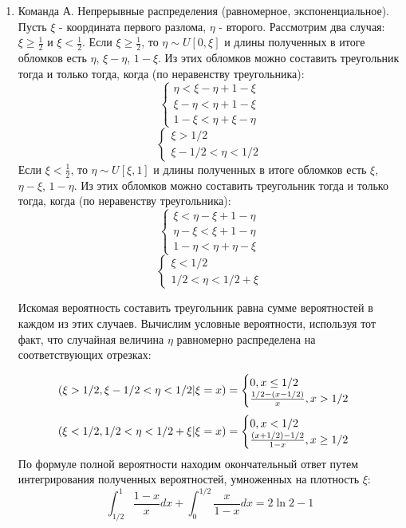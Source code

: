 \documentclass[a4paper,12pt]{article}
\let\P\relax
\DeclareMathOperator{\P}{\mathbb{P}}
\begin{document}
\begin{enumerate}
\item Команда А. Непрерывные распределения (равномерное, экспоненциальное).
Пусть $\xi$ - координата первого разлома, $\eta$ - второго. Рассмотрим два случая: $\xi\geq\frac{1}{2}$ и $\xi<\frac{1}{2}$.
Если $\xi\geq\frac{1}{2}$, то $\eta \sim U[0,\xi]$ и длины полученных в итоге обломков есть $\eta$, $\xi-\eta$, $1-\xi$. Из этих обломков можно составить треугольник тогда и только тогда, когда (по неравенству треугольника):
\[\begin{cases} \eta < \xi-\eta+1-\xi\\
\xi-\eta<\eta+1-\xi\\
1-\xi<\eta+\xi-\eta
\end{cases}
\]
\[\begin{cases} \xi>1/2\\
\xi-1/2<\eta<1/2
\end{cases}
\]
Если $\xi<\frac{1}{2}$, то $\eta \sim U[\xi,1]$ и длины полученных в итоге обломков есть $\xi$, $\eta-\xi$, $1-\eta$. Из этих обломков можно составить треугольник тогда и только тогда, когда (по неравенству треугольника):
\[\begin{cases} \xi < \eta-\xi+1-\eta\\
\eta-\xi<\xi+1-\eta\\
1-\eta<\eta+\eta-\xi
\end{cases}
\]
\[\begin{cases} \xi<1/2\\
1/2<\eta<1/2+\xi
\end{cases}
\]

Искомая вероятность составить треугольник равна сумме вероятностей в каждом из этих случаев. Вычислим условные вероятности, используя тот факт, что случайная величина $\eta$ равномерно распределена на соответствующих отрезках:

\[\P(\xi>1/2,\xi-1/2<\eta<1/2 | \xi=x)=\begin{cases}0,x\leq1/2\\
\frac{1/2-(x-1/2)}{x}, x>1/2
\end{cases}
\]
\[\P(\xi<1/2,1/2<\eta<1/2+\xi|\xi=x)=\begin{cases}0,x<1/2\\
\frac{(x+1/2)-1/2}{1-x}, x\geq1/2
\end{cases}
\]
По формуле полной вероятности находим окончательный ответ путем интегрирования полученных вероятностей, умноженных на плотность $\xi$:
\[\int^1_{1/2}\frac{1-x}{x}dx+\int^{1/2}_0\frac{x}{1-x}dx=2\ln2-1\]
\end{enumerate}
\end{document}
